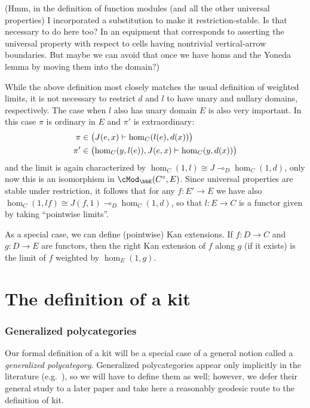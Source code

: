 \documentclass{amsart}
\newcommand{\K}{\bbK}
\let\mod\cMod
\def\modk{\mod_\K}
\def\mor#1{\hom_{#1}}
\renewcommand{\o}{^{\circ}}
\let\mto\vdash    %
\def\mhom#1#2{\left( #1 \vphantom{\big|}\mto #2 \right)}
\begin{document}
(Hmm, in the definition of function modules (and all the other universal properties) I incorporated a substitution to make it restriction-stable.  Is that necessary to do here too?  In an equipment that corresponds to asserting the universal property with respect to cells having nontrivial vertical-arrow boundaries.  But maybe we can avoid that once we have homs and the Yoneda lemma by moving them into the domain?)

While the above definition most closely matches the usual definition of weighted limits, it is not necessary to restrict $d$ and $l$ to have unary and nullary domains, respectively.
The case when $l$ also has unary domain $E$ is also very important.
In this case $\pi$ is ordinary in $E$ and $\pi'$ is extraordinary:
\begin{align*}
\pi &\in \mhom{J(e,x)}{\mor{C}(l(e),d(x))} \\
\pi' &\in \mhom{\mor{C}(y,l(e)),J(e,x)}{\mor{C}(y,d(x))}
\end{align*}
and the limit is again characterized by $\mor{C}(1,l) \cong J \multimap_D \mor{C}(1,d)$, only now this is an isomorphism in $\modk(C\o,E)$.
Since universal properties are stable under restriction, it follows that for any $f:E'\to E$ we have also $\mor{C}(1,l f) \cong J(f,1) \multimap_D \mor{C}(1,d)$, so that $l:E\to C$ is a functor given by taking ``pointwise limits''.

As a special case, we can define (pointwise) Kan extensions.
If $f:D\to C$ and $g:D\to E$ are functors, then the right Kan extension of $f$ along $g$ (if it exists) is the limit of $f$ weighted by $\mor{E}(1,g)$.

\part{The definition of a kit}
\label{part:def}

\section{Generalized polycategories}
\label{sec:genpoly}

Our formal definition of a kit will be a special case of a general notion called a \emph{generalized polycategory}.
Generalized polycategories appear only implicitly in the literature (e.g.~\cite{garner:polycats}), so we will have to define them as well; however, we defer their general study to a later paper and take here a reasonably geodesic route to the definition of kit.
\end{document}
